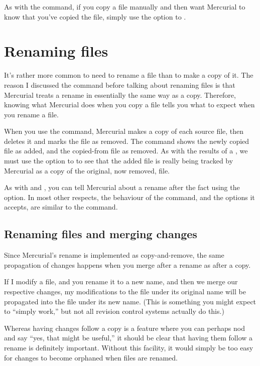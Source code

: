 As with the  command, if you copy a file manually and
then want Mercurial to know that you've copied the file, simply use
the  option to .

\section{Renaming files}

It's rather more common to need to rename a file than to make a copy
of it.  The reason I discussed the  command before talking
about renaming files is that Mercurial treats a rename in essentially
the same way as a copy.  Therefore, knowing what Mercurial does when
you copy a file tells you what to expect when you rename a file.

When you use the  command, Mercurial makes a copy of
each source file, then deletes it and marks the file as removed.
The  command shows the newly copied file as added, and
the copied-from file as removed.
As with the results of a , we must use the
 option to  to see that the added file
is really being tracked by Mercurial as a copy of the original, now
removed, file.

As with  and , you can tell Mercurial about
a rename after the fact using the  option.  In
most other respects, the behaviour of the  command, and
the options it accepts, are similar to the  command.

\subsection{Renaming files and merging changes}

Since Mercurial's rename is implemented as copy-and-remove, the same
propagation of changes happens when you merge after a rename as after
a copy.

If I modify a file, and you rename it to a new name, and then we merge
our respective changes, my modifications to the file under its
original name will be propagated into the file under its new name.
(This is something you might expect to ``simply work,'' but not all
revision control systems actually do this.)

Whereas having changes follow a copy is a feature where you can
perhaps nod and say ``yes, that might be useful,'' it should be clear
that having them follow a rename is definitely important.  Without
this facility, it would simply be too easy for changes to become
orphaned when files are renamed.

